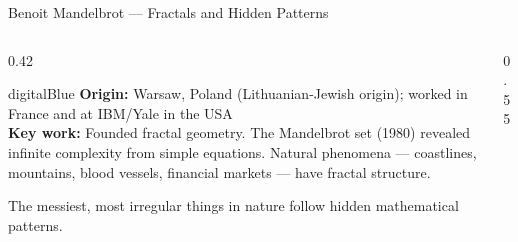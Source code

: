 \begin{frame}[shrink=24]{Benoit Mandelbrot --- Fractals and Hidden Patterns}

  \begin{columns}[T]
    \begin{column}{0.42\textwidth}
      \begin{personbox}{digitalBlue}
        \textbf{Origin:} Warsaw, Poland (Lithuanian-Jewish origin);
        worked in France and at IBM/Yale in the USA\\[3pt]
        \textbf{Key work:} Founded \alert{fractal geometry}. The Mandelbrot
        set (1980) revealed infinite complexity from simple equations.
        Natural phenomena --- coastlines, mountains, blood vessels,
        financial markets --- have fractal structure.
      \end{personbox}

      \vspace{0.3em}
      \begin{insightbox}
        The messiest, most irregular things in nature follow hidden
        mathematical patterns.
      \end{insightbox}
    \end{column}

    \begin{column}{0.55\textwidth}
    \end{column}
  \end{columns}

\end{frame}

